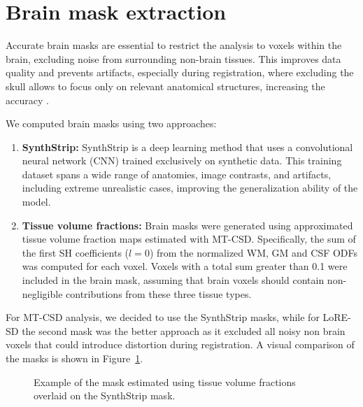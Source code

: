 \section{Brain mask extraction}
\label{sec:mask}
Accurate brain masks are essential to restrict the analysis to voxels within the brain, excluding noise from surrounding non-brain tissues. This improves data quality and prevents artifacts, especially during registration, where excluding the skull allows to focus only on relevant anatomical structures, increasing the accuracy \cite{ou2014}.

We computed brain masks using two approaches:
\begin{enumerate}

    \item \textbf{SynthStrip:} SynthStrip \cite{hoopes2022} is a deep learning method that uses a convolutional neural network (CNN) trained exclusively on synthetic data. This training dataset spans a wide range of anatomies, image contrasts, and artifacts, including extreme unrealistic cases, improving the generalization ability of the model.

    \item \textbf{Tissue volume fractions:} Brain masks were generated using approximated tissue volume fraction maps estimated with MT-CSD. Specifically, the sum of the first SH coefficients ($l=0$) from the normalized WM, GM and CSF ODFs was computed for each voxel. Voxels with a total sum greater than 0.1 were included in the brain mask, assuming that brain voxels should contain non-negligible contributions from these three tissue types.
\end{enumerate}
For MT-CSD analysis, we decided to use the SynthStrip masks, while for LoRE-SD the second mask was the better approach as it excluded all noisy non brain voxels that could introduce distortion during registration. A visual comparison of the masks is shown in Figure~\ref{fig:mask}.

\begin{figure}[h]
  \centering
  \caption{Example of the mask estimated using tissue volume fractions overlaid on the SynthStrip mask.}
  \label{fig:mask}
\end{figure}

